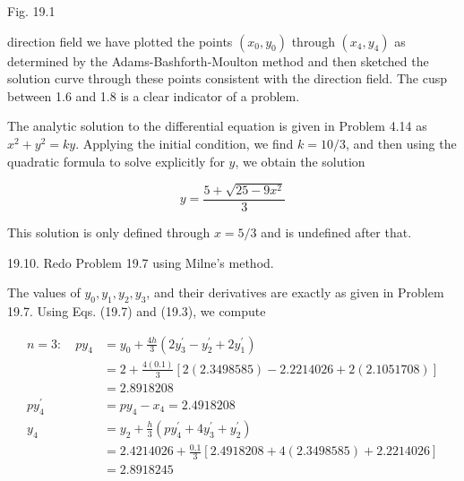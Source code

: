 \documentclass[10pt]{article}
\begin{document}
Fig. 19.1

direction field we have plotted the points $\left(x_{0}, y_{0}\right)$ through $\left(x_{4}, y_{4}\right)$ as determined by the Adams-Bashforth-Moulton method and then sketched the solution curve through these points consistent with the direction field. The cusp between 1.6 and 1.8 is a clear indicator of a problem.

The analytic solution to the differential equation is given in Problem 4.14 as $x^{2}+y^{2}=k y$. Applying the initial condition, we find $k=10 / 3$, and then using the quadratic formula to solve explicitly for $y$, we obtain the solution

$$
y=\frac{5+\sqrt{25-9 x^{2}}}{3}
$$

This solution is only defined through $x=5 / 3$ and is undefined after that.

19.10. Redo Problem 19.7 using Milne's method.

The values of $y_{0}, y_{1}, y_{2}, y_{3}$, and their derivatives are exactly as given in Problem 19.7. Using Eqs. (19.7) and (19.3), we compute

$$
\begin{aligned}
n=3: \quad p y_{4} & =y_{0}+\frac{4 h}{3}\left(2 y_{3}^{\prime}-y_{2}^{\prime}+2 y_{1}^{\prime}\right) \\
& =2+\frac{4(0.1)}{3}[2(2.3498585)-2.2214026+2(2.1051708)] \\
& =2.8918208 \\
p y_{4}^{\prime} & =p y_{4}-x_{4}=2.4918208 \\
y_{4} & =y_{2}+\frac{h}{3}\left(p y_{4}^{\prime}+4 y_{3}^{\prime}+y_{2}^{\prime}\right) \\
& =2.4214026+\frac{0.1}{3}[2.4918208+4(2.3498585)+2.2214026] \\
& =2.8918245
\end{aligned}
$$
\end{document}
